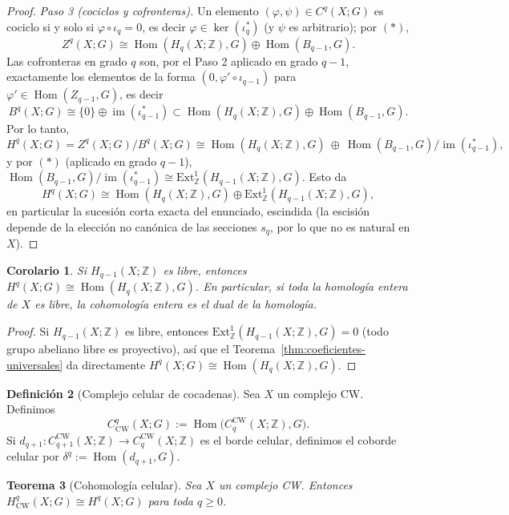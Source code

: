 \documentclass[11pt,a4paper]{article}
\theoremstyle{plain}
\newtheorem{theorem}{Teorema}[section]
\newtheorem{corollary}[theorem]{Corolario}
\theoremstyle{definition}
\newtheorem{definition}[theorem]{Definición}
\theoremstyle{remark}
\newcommand{\ZZ}{\mathbb Z}
\DeclareMathOperator{\im}{im}
\DeclareMathOperator{\Hom}{Hom}
\newcommand{\CWq}{\mathrm{CW}}
\begin{document}
\begin{proof}
\emph{Paso 3 (cociclos y cofronteras).} Un elemento $(\varphi,\psi)\in C^q(X;G)$
es cociclo si y solo si $\varphi\circ\iota_q=0$, es decir
$\varphi\in\ker(\iota_q^*)$ (y $\psi$ es arbitrario); por $(*)$,
\[
Z^q(X;G)\cong\Hom(H_q(X;\ZZ),G)\oplus\Hom(B_{q-1},G).
\]
Las cofronteras en grado $q$ son, por el Paso 2 aplicado en grado $q-1$,
exactamente los elementos de la forma $(0,\varphi'\circ\iota_{q-1})$ para
$\varphi'\in\Hom(Z_{q-1},G)$, es decir
\[
B^q(X;G)\cong\{0\}\oplus\im(\iota_{q-1}^*)\subset\Hom(H_q(X;\ZZ),G)\oplus\Hom(B_{q-1},G).
\]
Por lo tanto,
\[
H^q(X;G)=Z^q(X;G)/B^q(X;G)\cong\Hom(H_q(X;\ZZ),G)\ \oplus\ \Hom(B_{q-1},G)/\im(\iota_{q-1}^*),
\]
y por $(*)$ (aplicado en grado $q-1$), $\Hom(B_{q-1},G)/\im(\iota_{q-1}^*)\cong\mathrm{Ext}^1_\ZZ(H_{q-1}(X;\ZZ),G)$.
Esto da
\[
H^q(X;G)\cong\Hom(H_q(X;\ZZ),G)\oplus\mathrm{Ext}^1_\ZZ(H_{q-1}(X;\ZZ),G),
\]
en particular la sucesión corta exacta del enunciado, escindida (la
escisión depende de la elección no canónica de las secciones $s_q$, por
lo que no es natural en $X$).
\end{proof}

\begin{corollary}
\label{cor:cohomologia-libre}
Si $H_{q-1}(X;\ZZ)$ es libre, entonces $H^q(X;G)\cong\Hom(H_q(X;\ZZ),G)$.
En particular, si toda la homología entera de $X$ es libre, la cohomología
entera es el dual de la homología.
\end{corollary}

\begin{proof}
Si $H_{q-1}(X;\ZZ)$ es libre, entonces
$\mathrm{Ext}^1_\ZZ(H_{q-1}(X;\ZZ),G)=0$ (todo grupo abeliano libre es
proyectivo), así que el Teorema~\ref{thm:coeficientes-universales} da
directamente $H^q(X;G)\cong\Hom(H_q(X;\ZZ),G)$.
\end{proof}

\begin{definition}[Complejo celular de cocadenas]
\label{def:cocadenas-celulares}
Sea $X$ un complejo CW. Definimos
\[
C^q_{\CWq}(X;G):=\Hom\big(C_q^{\CWq}(X;\ZZ),G\big).
\]
Si $d_{q+1}:C_{q+1}^{\CWq}(X;\ZZ)\to C_q^{\CWq}(X;\ZZ)$ es el borde
celular, definimos el coborde celular por
$\delta^q:=\Hom(d_{q+1},G)$.
\end{definition}

\begin{theorem}[Cohomología celular]
\label{thm:cohomologia-celular}
Sea $X$ un complejo CW. Entonces $H^q_{\CWq}(X;G)\cong H^q(X;G)$ para toda
$q\ge0$.
\end{theorem}
\end{document}
